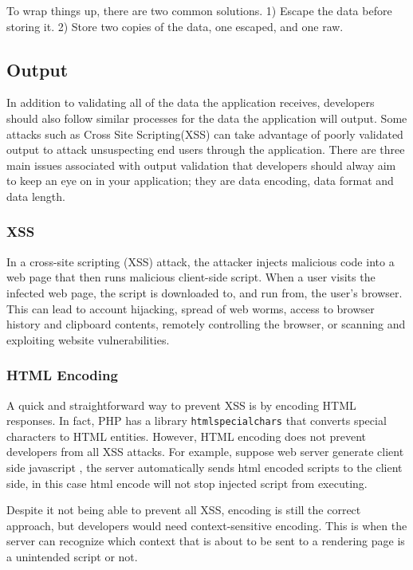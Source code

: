 \documentclass[conference]{IEEEtran}
\begin{document}
To wrap things up, there are two common solutions. 1) Escape the data before storing it. 2) Store two copies of the data, one escaped, and one raw.

\subsection{Output}
In addition to validating all of the data the application receives, developers should also follow similar processes for the data the application will output. Some attacks such as Cross Site Scripting(XSS) can take advantage of poorly validated output to attack unsuspecting end users through the application. There are three main issues associated with output validation that developers should alway aim to keep an eye on in your application; they are data encoding, data format and data length\cite{outputvalidation}.

\subsubsection{XSS}
In a cross-site scripting (XSS) attack, the attacker injects malicious code into a web page that then runs malicious client-side script. When a user visits the infected web page, the script is downloaded to, and run from, the user's browser. This can lead to account hijacking, spread of web worms, access to browser history and clipboard contents, remotely controlling the browser, or scanning and exploiting website vulnerabilities\cite{XSS}.

\subsubsection{HTML Encoding}
A quick and straightforward way to prevent XSS is by encoding HTML responses. In fact, PHP has a library \texttt{htmlspecialchars}\cite{htmlspecialchars} that converts special characters to HTML entities. However, HTML encoding does not prevent developers from all XSS attacks. For example, suppose web server generate client side javascript , the server automatically sends html encoded scripts to the client side, in this case html encode will not stop injected script from executing.

Despite it not being able to prevent all XSS, encoding is still the correct approach, but developers would need context-sensitive encoding\cite{contextencoding}. This is when the server can recognize which context that is about to be sent to a rendering page is a unintended script or not.
\end{document}
